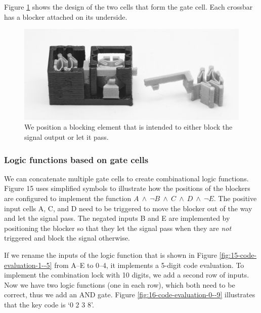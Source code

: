 Figure \ref{fig:14-signal-blocking} shows the design of the two cells that form the gate cell. Each crossbar has a blocker attached on its underside.

\begin{figure} [h]  
    \includegraphics[width=\textwidth]{chapters/digital-metamaterials-FIG/14-signal-blocking.JPG}
    \caption[Short figure name.]{We position a blocking element that is intended to either block the signal output or let it pass.
    \label{fig:14-signal-blocking}}
\end{figure}


\subsubsection{Logic functions based on gate cells}

We can concatenate multiple gate cells to create combinational logic functions. Figure 15 uses simplified symbols to illustrate how the positions of the blockers are configured to implement the function $A\ {\land}\ {\neg}B\ {\land}\ C\ {\land}\ D\ {\land}\ {\neg}E$. The positive input cells A, C, and D need to be triggered to move the blocker out of the way and let the signal pass. The negated inputs B and E are implemented by positioning the blocker so that they let the signal pass when they are \textit{not} triggered and block the signal otherwise.

If we rename the inputs of the logic function that is shown in Figure \ref{fig:15-code-evaluation-1--5} from A--E to 0--4, it implements a 5-digit code evaluation. To implement the combination lock with 10 digits, we add a second row of inputs. Now we have two logic functions (one in each row), which both need to be correct, thus we add an AND gate. Figure \ref{fig:16-code-evaluation-0--9} illustrates that the key code is `0 2 3 8'. 

